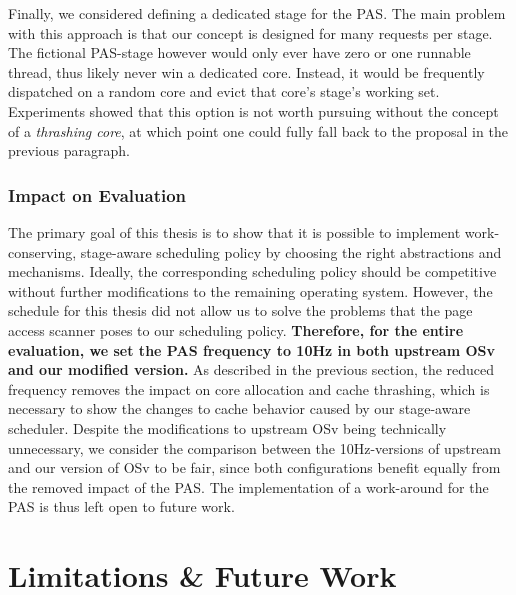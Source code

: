 \documentclass[12pt,a4paper]{book}
\begin{document}
Finally, we considered defining a dedicated stage for the PAS.
The main problem with this approach is that our concept is designed for many requests per stage.
The fictional PAS-stage however would only ever have zero or one runnable thread, thus likely never win a dedicated core.
Instead, it would be frequently dispatched on a random core and evict that core's stage's working set.
Experiments showed that this option is not worth pursuing without the concept of a \emph{thrashing core}, at which point one could fully fall back to the proposal in the previous paragraph.

\subsubsection{Impact on Evaluation}\label{ch:di:pol:pas:eval}
The primary goal of this thesis is to show that it is possible to implement work-conserving, stage-aware scheduling policy by choosing the right abstractions and mechanisms.
Ideally, the corresponding scheduling policy should be competitive without further modifications to the remaining operating system.
However, the schedule for this thesis did not allow us to solve the problems that the page access scanner poses to our scheduling policy.
\textbf{Therefore, for the entire evaluation, we set the PAS frequency to 10Hz in both upstream OSv and our modified version.}
As described in the previous section, the reduced frequency removes the impact on core allocation and cache thrashing, which is necessary to show the changes to cache behavior caused by our stage-aware scheduler.
Despite the modifications to upstream OSv being technically unnecessary, we consider the comparison between the 10Hz-versions of upstream and our version of OSv to be fair, since both configurations benefit equally from the removed impact of the PAS.
The implementation of a work-around for the PAS is thus left open to future work.


\section{Limitations \& Future Work}\label{ch:di:discuss}
\end{document}
